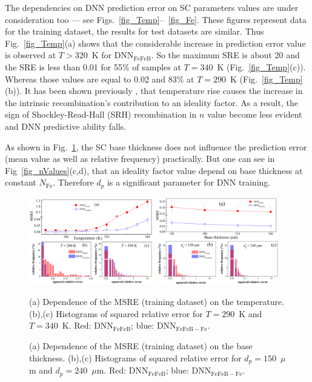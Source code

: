 \documentclass[num-refs]{wiley-article} %
\begin{document}
The dependencies on DNN prediction error on SC parameters values are under consideration too ---
see Figs.~\ref{fig_Temp}--~\ref{fig_Fe}.
These figures represent data for the training dataset, the results for test datasets are similar.
Thus Fig.~\ref{fig_Temp}(a) shows that the considerable increase in prediction error value is observed at $T>320$~K for DNN$_\mathrm{FeFeB}$.
So the maximum SRE is about 20 and the SRE is less than 0.01 for 55\% of samples at $T=340$~K
(Fig.~\ref{fig_Temp}(c)).
Whereas those values are equal to 0.02 and 83\% at $T=290$~K (Fig.~\ref{fig_Temp}(b)).
It has been shown previously \cite{OlikhJPS}, that temperature rise causes the increase in
the intrinsic recombination's contribution to an ideality factor.
As a result, the sign of Shockley-Read-Hall (SRH) recombination in $n$ value become less evident
and DNN predictive ability falls.

As shown in Fig.~\ref{fig_depth}, the SC base thickness does not influence the prediction error
(mean value as well as relative frequency) practically.
But one can see in Fig~\ref{fig_nValues}(c,d), that an ideality factor value depend on
base thickness at constant $N_\mathrm{Fe}$.
Therefore $d_p$ is a significant parameter for DNN training.

\begin{figure}[tb]
\centering
\includegraphics[width=0.48\textwidth]{F4} \hfill
\includegraphics[width=0.48\textwidth]{F5} \\
\parbox[t]{0.48\textwidth}
{\caption{(a) Dependence of the MSRE (training dataset) on the temperature.
(b),(c) Histograms of squared relative error for $T=290$~K and $T=340$~K.
Red: DNN$_\mathrm{FeFeB}$; blue: DNN$_\mathrm{FeFeB-Fe}$.
}
\label{fig_Temp}} \hfill
\parbox[t]{0.48\textwidth}{\caption{(a) Dependence of the MSRE (training dataset) on the base thickness.
(b),(c) Histograms of squared relative error for $d_p=150$~$\mu$m and $d_p=240$~$\mu$m.
Red: DNN$_\mathrm{FeFeB}$; blue: DNN$_\mathrm{FeFeB-Fe}$.}
\label{fig_depth}}
\end{figure}
\end{document}
